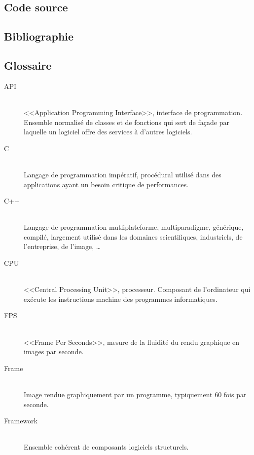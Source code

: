 \documentclass[a4paper,french,12pt]{article}
\begin{document}
		
	\subsection{Code source}
	\FloatBarrier
	
	
	\subsection{Bibliographie}
	

		
	\subsection{Glossaire}
		\begin{description}
		
		\item [API]~\\
		    <<Application Programming Interface>>, interface de programmation. Ensemble normalisé de classes et de 
		    fonctions qui sert de façade par laquelle un logiciel offre des services à d'autres logiciels.
		
		\item [C] ~\\
		    Langage de programmation impératif, procédural utilisé dans des applications ayant un besoin critique
		    de performances.
		    
		 \item [C++] ~\\
		    Langage de programmation mutliplateforme, multiparadigme, générique, compilé, largement utilisé
		    dans les domaines scientifiques, industriels, de l'entreprise, de l'image, \ldots
		 
		 \item [CPU]~\\
		    <<Central Processing Unit>>, processeur. 
		    Composant de l'ordinateur qui exécute les instructions machine des programmes informatiques.
		 
		 \item [FPS] ~\\
		      <<Frame Per Seconds>>, mesure de la fluidité du rendu graphique en images par seconde.
		 
		 \item [Frame]~\\
		    Image rendue graphiquement par un programme, typiquement 60 fois par seconde.
		    
		 \item [Framework]~\\
		    Ensemble cohérent de composants logiciels structurels.


\end{description}
\end{document}
